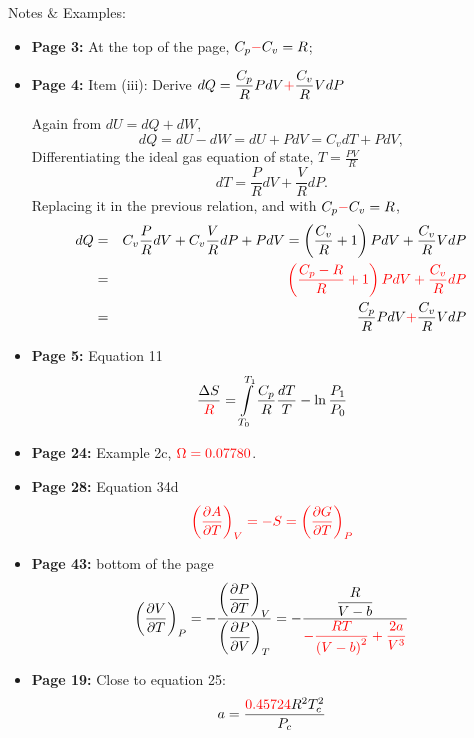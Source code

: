 \documentclass[12pts,a4paper,amsmath,amssymb,floatfix]{article}%
\newcommand{\frc}{\displaystyle\frac}
\newcommand{\red}{\textcolor{red}}
\newcommand{\Partial}[3][error]{\left(\frc{\partial #1}{\partial #2}\right)_{#3}}
\begin{document}
\noindent
{\Large Notes $\&$ Examples:}
\begin{itemize}
%
  \item {\bf Page 3:}  At the top of the page, $C_{p}\red{-}C_{v}=R$;
%
  \item {\bf Page 4:}  Item (iii): Derive $dQ=\frc{C_{p}}{R} PdV \red{+} \frc{C_{v}}{R} VdP$

           Again from $dU = dQ + dW$,
           \begin{displaymath}
               dQ = dU -dW = dU + PdV = C_{v}dT + PdV,
           \end{displaymath}
           Differentiating the ideal gas equation of state, $T=\frc{PV}{R}$
           \begin{displaymath}
                dT = \frc{P}{R}dV + \frc{V}{R}dP.
           \end{displaymath}
           Replacing it in the previous relation, and with $C_{p}\red{-}C_{v}=R$,
           \begin{eqnarray}
             dQ &=& C_{v}\frc{P}{R}dV + C_{v}\frc{V}{R}dP + PdV = \left(\frc{C_{v}}{R}+1\right)PdV + \frc{C_{v}}{R}VdP \nonumber \\
                &=& \red{\left(\frc{C_{p}-R}{R}+1\right)PdV + \frc{C_{v}}{R}dP} \nonumber \\
                &=&  \frc{C_{p}}{R} PdV \red{+} \frc{C_{v}}{R} VdP  \nonumber
           \end{eqnarray}
%
   \item {\bf Page 5:} Equation 11
     \begin{displaymath}
       \frc{\Delta S}{\red{R}} = \int\limits_{T_{0}}^{T_{1}} \frc{C_{p}}{R}\frc{dT}{T} - \ln{\frc{P_{1}}{P_{0}}}
     \end{displaymath}
%
   \item {\bf Page 24:} Example 2c, $\red{\Omega=0.07780}$.
%
   \item {\bf Page 28:} Equation 34d
     \begin{displaymath}
        \red{\left(\frc{\partial A}{\partial T}\right)_{V} = -S =  \left(\frc{\partial G}{\partial T}\right)_{P}}
     \end{displaymath}
%
   \item {\bf Page 43:} bottom of the page
     \begin{displaymath}
       \Partial[V]{T}{P} = -\frc{\Partial[P]{T}{V}}{\Partial[P]{V}{T}} = -\frc{\frc{R}{V-b}}{\red{-\frc{RT}{\left(V-b\right)^{2}}+\frc{2a}{V^{3}}}} 
     \end{displaymath}
%
   \item {\bf Page 19:} Close to equation 25: 
                          \begin{displaymath}
                              a = \frc{\red{0.45724} R^{2}T_{c}^{2}}{P_{c}}
                          \end{displaymath}    


\end{itemize}
\end{document}

